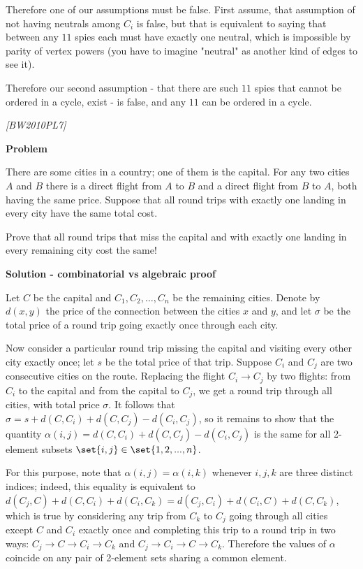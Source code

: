 \begin{problem}
Therefore one of our assumptions must be false. First assume, that assumption of not having neutrals among $C_i$ is false, but that is equivalent to saying that between any $11$ spies each must have exactly one neutral, which is impossible by parity of vertex powers (you have to imagine "neutral" as another kind of edges to see it).

Therefore our second assumption - that there are such $11$ spies that cannot be ordered in a cycle, exist - is false, and any $11$ can be ordered in a cycle.
\end{problem}
%

\filbreak

\begin{problem}
\textit{[BW2010PL7]}



\textbf{Problem}


There are some cities in a country; one of them is the capital. For any two cities $A$ and $B$ there is a direct flight from $A$ to $B$ and a direct flight from $B$ to $A$, both having the
same price. Suppose that all round trips with exactly one landing in every city have the same total cost. 

Prove that all round trips that miss the capital and with exactly one landing in every remaining city cost the same!



\textbf{Solution - combinatorial vs algebraic proof}


Let $C$ be the capital and $C_1, C_2, \dots, C_n$ be the remaining cities. Denote by $d(x, y)$
the price of the connection between the cities $x$ and $y$, and let $\sigma$ be the total price of a round
trip going exactly once through each city.


Now consider a particular round trip missing the capital and visiting every other city exactly once; let $s$ be the total price of that trip. Suppose $C_i$ and $C_j$ are two consecutive cities on the route.
Replacing the flight $C_i \rightarrow C_j$ by two flights: from $C_i$ to the capital and from the capital to $C_j$, we
get a round trip through all cities, with total price $\sigma$. It follows that $\sigma = s+d(C, C_i)+d(C, C_j )−d(C_i, C_j )$, so it remains to show that the quantity $\alpha(i,j) = d(C, C_i) + d(C, C_j )−d(C_i, C_j )$ is the same for all 2-element subsets $\set{i, j} \in \set{1, 2, . . . , n}$.



For this purpose, note that $\alpha(i, j) = \alpha(i, k)$ whenever $i, j, k$ are three distinct indices; indeed,
this equality is equivalent to $d(C_j , C) + d(C, C_i) + d(C_i, C_k) = d(C_j , C_i) + d(C_i, C) + d(C, C_k)$, which is true by considering any trip from $C_k$ to $C_j$ going through all cities except $C$ and $C_i$ exactly once and completing this trip to a round trip in two ways: $C_j \rightarrow C \rightarrow C_i \rightarrow C_k$ and $C_j \rightarrow C_i \rightarrow C \rightarrow C_k$. Therefore the values of $\alpha$ coincide on any pair of 2-element sets sharing a common element. 


\end{problem}
